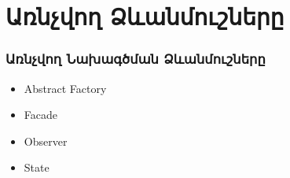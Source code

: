 \documentclass{beamer}
\begin{document}
\section{Առնչվող Ձևանմուշները}
\begin{frame}\frametitle{Առնչվող Նախագծման Ձևանմուշները}
\begin{itemize}
    \item Abstract Factory \vfill
    \item Facade \vfill
    \item Observer \vfill
    \item State
\end{itemize}
\end{frame}
\end{document}
